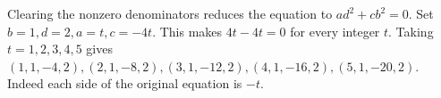 Clearing the nonzero denominators reduces the equation to $ ad^2+cb^2=0 $. Set $ b=1,d=2,a=t,c=-4t $. This makes $ 4t-4t=0 $ for every integer $ t $. Taking $ t=1,2,3,4,5 $ gives $(1,1,-4,2),(2,1,-8,2),(3,1,-12,2),(4,1,-16,2),(5,1,-20,2)$. Indeed each side of the original equation is $-t $.
